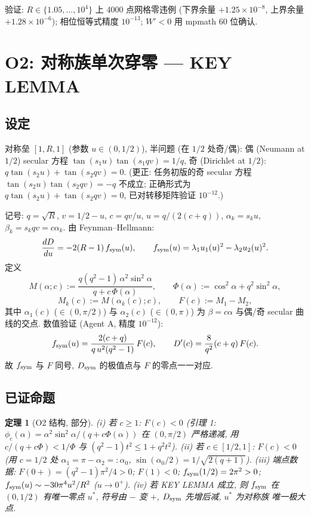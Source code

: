 \documentclass[UTF8]{ctexart}
\newtheorem{theorem}{定理}[section]
\begin{document}
验证: $R \in \{1.05,\dots,10^4\}$ 上 4000 点网格零违例
(下界余量 $+1.25\times10^{-8}$, 上界余量 $+1.28\times10^{-6}$);
相位恒等式精度 $10^{-13}$; $W'<0$ 用 mpmath 60 位确认.

\section{O2: 对称族单次穿零 --- KEY LEMMA}

\subsection{设定}

对称垒 $[1,R,1]$ (参数 $u \in (0,1/2)$), 半问题 (在 $1/2$ 处奇/偶):
偶 (Neumann at $1/2$) secular 方程
$\tan(s_1u)\tan(s_1 q v) = 1/q$, 奇 (Dirichlet at $1/2$):
$q\tan(s_2u) + \tan(s_2qv) = 0$.
(更正: 任务初版的奇 secular 方程 $\tan(s_2u)\tan(s_2qv)=-q$ 不成立;
正确形式为 $q\tan(s_2u)+\tan(s_2qv)=0$, 已对转移矩阵验证 $10^{-12}$.)

记号: $q=\sqrt R$, $v=1/2-u$, $c = qv/u$, $u = q/(2(c+q))$, $\alpha_k = s_ku$,
$\beta_k = s_k q v = c\alpha_k$. 由 Feynman--Hellmann:
\begin{equation}
	\frac{dD}{du} = -2(R-1)\, f_{\rm sym}(u),
	\qquad f_{\rm sym}(u) = \lambda_1 u_1(u)^2 - \lambda_2 u_2(u)^2 .
\end{equation}
定义
\begin{equation}
	M(\alpha;c) := \frac{q(q^2-1)\,\alpha^2\sin^2\alpha}{q + c\,\Phi(\alpha)},
	\qquad \Phi(\alpha) := \cos^2\alpha + q^2\sin^2\alpha,
\end{equation}
\begin{equation}
	M_k(c) := M(\alpha_k(c);c), \qquad F(c) := M_1 - M_2,
\end{equation}
其中 $\alpha_1(c)$ ($\in(0,\pi/2)$) 与 $\alpha_2(c)$ ($\in(0,\pi)$) 为
$\beta = c\alpha$ 与偶/奇 secular 曲线的交点. 数值验证 (Agent A, 精度
$10^{-12}$):
\begin{equation}
	f_{\rm sym}(u) = \frac{2(c+q)}{q\,u^2(q^2-1)}\,F(c), \qquad
	D'(c) = \frac{8}{q^2}(c+q)\,F(c).
\end{equation}
故 $f_{\rm sym}$ 与 $F$ 同号, $D_{\rm sym}$ 的极值点与 $F$ 的零点一一对应.

\subsection{已证命题}

\begin{theorem}[O2 结构, 部分]
(i) 若 $c\ge 1$: $F(c) < 0$ (引理 1: $\phi_c(\alpha)=\alpha^2\sin^2\alpha/(q+c\Phi(\alpha))$
在 $(0,\pi/2)$ 严格递减, 用 $c/(q+c\Phi) < 1/\Phi$ 与
$(q^2-1)t^2 \le 1+q^2t^2$).
(ii) 若 $c\in[1/2,1]$: $F(c) < 0$ (用 $c=1/2$ 处
$\alpha_1 = \pi-\alpha_2 =: \alpha_0$, $\sin(\alpha_0/2)=1/\sqrt{2(q+1)}$).
(iii) 端点数据: $F(0+) = (q^2-1)\pi^2/4 > 0$; $F(1) < 0$;
$f_{\rm sym}(1/2) = 2\pi^2 > 0$; $f_{\rm sym}(u) \sim -30\pi^4u^2/R^2$ ($u\to0^+$).
(iv) 若 KEY LEMMA 成立, 则 $f_{\rm sym}$ 在 $(0,1/2)$ 有唯一零点
$u^*$, 符号由 $-$ 变 $+$, $D_{\rm sym}$ 先增后减, $u^*$ 为对称族
唯一极大点.
\end{theorem}
\end{document}
